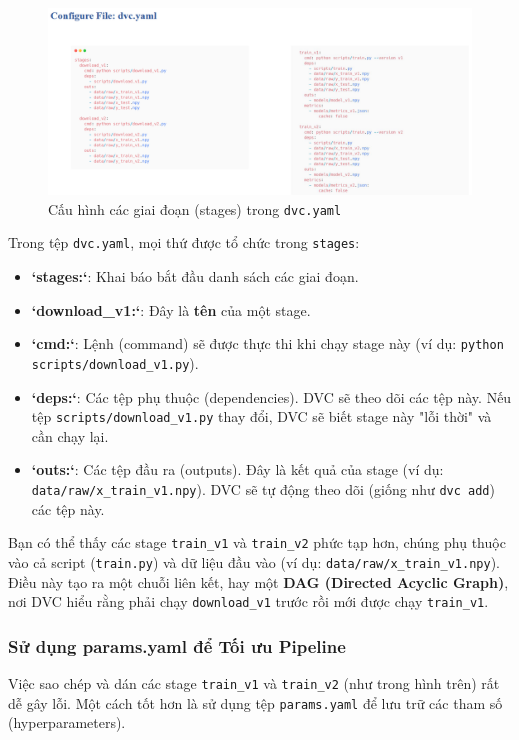 \documentclass[11pt]{article}
\begin{document}
\begin{figure}[H]
    \centering
    \includegraphics[width=1.0\linewidth]{images/auto1.png}
    \caption{Cấu hình các giai đoạn (stages) trong \texttt{dvc.yaml}}
\end{figure}

Trong tệp \texttt{dvc.yaml}, mọi thứ được tổ chức trong \texttt{stages}:
\begin{itemize}
    \item \textbf{`stages:`}: Khai báo bắt đầu danh sách các giai đoạn.
    \item \textbf{`download\_v1:`}: Đây là \textbf{tên} của một stage.
    \item \textbf{`cmd:`}: Lệnh (command) sẽ được thực thi khi chạy stage này (ví dụ: \texttt{python scripts/download\_v1.py}).
    \item \textbf{`deps:`}: Các tệp phụ thuộc (dependencies). DVC sẽ theo dõi các tệp này. Nếu tệp \texttt{scripts/download\_v1.py} thay đổi, DVC sẽ biết stage này "lỗi thời" và cần chạy lại.
    \item \textbf{`outs:`}: Các tệp đầu ra (outputs). Đây là kết quả của stage (ví dụ: \texttt{data/raw/x\_train\_v1.npy}). DVC sẽ tự động theo dõi (giống như \texttt{dvc add}) các tệp này.
\end{itemize}
Bạn có thể thấy các stage \texttt{train\_v1} và \texttt{train\_v2} phức tạp hơn, chúng phụ thuộc vào cả script (\texttt{train.py}) và dữ liệu đầu vào (ví dụ: \texttt{data/raw/x\_train\_v1.npy}). Điều này tạo ra một chuỗi liên kết, hay một \textbf{DAG (Directed Acyclic Graph)}, nơi DVC hiểu rằng phải chạy \texttt{download\_v1} trước rồi mới được chạy \texttt{train\_v1}.

\subsubsection{Sử dụng params.yaml để Tối ưu Pipeline}
Việc sao chép và dán các stage \texttt{train\_v1} và \texttt{train\_v2} (như trong hình trên) rất dễ gây lỗi. Một cách tốt hơn là sử dụng tệp \texttt{params.yaml} để lưu trữ các tham số (hyperparameters).
\end{document}
